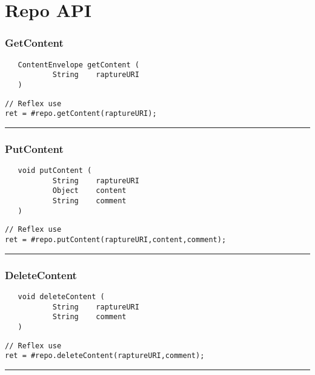 \section{Repo API}

\subsubsection{GetContent}
\label{Api:GetContent}
\begin{verbatim}
   ContentEnvelope getContent (
           String    raptureURI
   )
\end{verbatim}
\begin{lstlisting}[language=reflex]
// Reflex use
ret = #repo.getContent(raptureURI);
\end{lstlisting}



\rule{15cm}{2pt}
\subsubsection{PutContent}
\label{Api:PutContent}
\begin{verbatim}
   void putContent (
           String    raptureURI
           Object    content
           String    comment
   )
\end{verbatim}
\begin{lstlisting}[language=reflex]
// Reflex use
ret = #repo.putContent(raptureURI,content,comment);
\end{lstlisting}



\rule{15cm}{2pt}
\subsubsection{DeleteContent}
\label{Api:DeleteContent}
\begin{verbatim}
   void deleteContent (
           String    raptureURI
           String    comment
   )
\end{verbatim}
\begin{lstlisting}[language=reflex]
// Reflex use
ret = #repo.deleteContent(raptureURI,comment);
\end{lstlisting}



\rule{15cm}{2pt}
